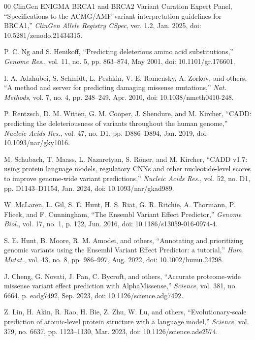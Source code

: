 \documentclass[10pt,journal]{IEEEtran}
\begin{document}
\begin{thebibliography}{00}
 ClinGen ENIGMA BRCA1 and BRCA2 Variant Curation Expert Panel, ``Specifications to the ACMG/AMP variant interpretation guidelines for BRCA1,'' \textit{ClinGen Allele Registry CSpec}, ver. 1.2, Jan. 2025, doi: 10.5281/zenodo.21434315.

 P. C. Ng and S. Henikoff, ``Predicting deleterious amino acid substitutions,'' \textit{Genome Res.}, vol. 11, no. 5, pp. 863--874, May 2001, doi: 10.1101/gr.176601.

 I. A. Adzhubei, S. Schmidt, L. Peshkin, V. E. Ramensky, A. Zorkov, and others, ``A method and server for predicting damaging missense mutations,'' \textit{Nat. Methods}, vol. 7, no. 4, pp. 248--249, Apr. 2010, doi: 10.1038/nmeth0410-248.

 P. Rentzsch, D. M. Witten, G. M. Cooper, J. Shendure, and M. Kircher, ``CADD: predicting the deleteriousness of variants throughout the human genome,'' \textit{Nucleic Acids Res.}, vol. 47, no. D1, pp. D886--D894, Jan. 2019, doi: 10.1093/nar/gky1016.

 M. Schubach, T. Maass, L. Nazaretyan, S. R\"oner, and M. Kircher, ``CADD v1.7: using protein language models, regulatory CNNs and other nucleotide-level scores to improve genome-wide variant predictions,'' \textit{Nucleic Acids Res.}, vol. 52, no. D1, pp. D1143--D1154, Jan. 2024, doi: 10.1093/nar/gkad989.

 W. McLaren, L. Gil, S. E. Hunt, H. S. Riat, G. R. Ritchie, A. Thormann, P. Flicek, and F. Cunningham, ``The Ensembl Variant Effect Predictor,'' \textit{Genome Biol.}, vol. 17, no. 1, p. 122, Jun. 2016, doi: 10.1186/s13059-016-0974-4.

 S. E. Hunt, B. Moore, R. M. Amodei, and others, ``Annotating and prioritizing genomic variants using the Ensembl Variant Effect Predictor: a tutorial,'' \textit{Hum. Mutat.}, vol. 43, no. 8, pp. 986--997, Aug. 2022, doi: 10.1002/humu.24298.

 J. Cheng, G. Novati, J. Pan, C. Bycroft, and others, ``Accurate proteome-wide missense variant effect prediction with AlphaMissense,'' \textit{Science}, vol. 381, no. 6664, p. eadg7492, Sep. 2023, doi: 10.1126/science.adg7492.

 Z. Lin, H. Akin, R. Rao, H. Bie, Z. Zhu, W. Lu, and others, ``Evolutionary-scale prediction of atomic-level protein structure with a language model,'' \textit{Science}, vol. 379, no. 6637, pp. 1123--1130, Mar. 2023, doi: 10.1126/science.ade2574.


\end{thebibliography}
\end{document}
